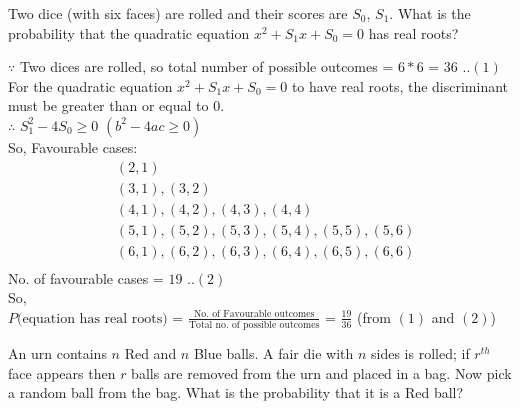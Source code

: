 \documentclass[12pt]{article}
\begin{document}
    \noindent
    
    \onehalfspace

    \begin{question}
        Two dice (with six faces) are rolled and their scores are $S_0$, $S_1$. What is the probability that the quadratic equation $x^2 + S_1x + S_0 = 0$ has real roots?
    \end{question}
    \begin{solution}
        $\because$ Two dices are rolled, so total number of possible outcomes = $6*6$ = $36$     \quad\quad  ..$(1)$\\
        For the quadratic equation $x^2 + S_1x + S_0 = 0$ to have real roots, the discriminant must be greater than or equal to 0.\\
        $\therefore$ $S_1^2 - 4S_0 \ge 0$ $(b^2-4ac\ge0)$\\
        So, Favourable cases:
        \begin{align*}
        &(2,1)\\
        &(3,1),(3,2)\\
        &(4,1),(4,2),(4,3),(4,4)\\
        &(5,1),(5,2),(5,3),(5,4),(5,5),(5,6)\\
        &(6,1),(6,2),(6,3),(6,4),(6,5),(6,6)\\
        \end{align*}
        No. of favourable cases = $19$      \quad\quad  ..$(2)$\\
        So,\\ $P(\text{equation has real roots)}$ \:=\: $\frac{\text{No. of Favourable outcomes}}{\text{Total no. of possible outcomes}}$
        = $\frac{19}{36}$     \quad\quad  (from $(1)$ and $(2)$)
    \end{solution}

    \begin{question}
        An urn contains $n$ Red and $n$ Blue balls. A fair die with $n$ sides is rolled; if $r^{th}$ face appears then $r$ balls are removed from the urn and placed in a bag. Now pick a random ball from the bag. What is the probability that it is a Red ball?
    \end{question}
    
\end{document}
